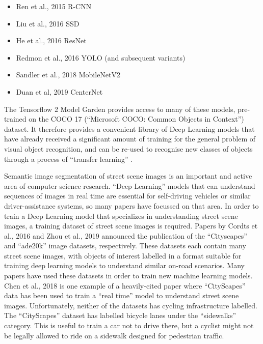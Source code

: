\documentclass[11pt,twoside]{report}
\begin{document}
\begin{itemize}
\item{Ren et al., 2015 \cite{REN2016} R-CNN}
\item{Liu et al., 2016 \cite{ssd} SSD}
\item{He et al., 2016 \cite{He_2016_CVPR} ResNet}
\item{Redmon et al., 2016 \cite{YOLOv1} YOLO (and subsequent variants)}
\item{Sandler et al., 2018 \cite{MobileNetV2} MobileNetV2}
\item{Duan et al, 2019 \cite{centernet} CenterNet}
\end{itemize}

The Tensorflow 2 Model Garden \cite{zoo} provides access to many of these models, pre-trained on the COCO 17 (``Microsoft COCO: Common Objects in Context'') dataset.  It therefore provides a convenient library of Deep Learning models that have already received a significant amount of training for the general problem of visual object recognition, and can be re-used to recognise new classes of objects through a process of ``transfer learning'' \cite{coco} \cite{transferlearning}.

Semantic image segmentation of street scene images is an important and active area of computer science research.  ``Deep Learning'' models that can understand sequences of images in real time are essential for self-driving vehicles or similar driver-assistance systems, so many papers have focussed on that area.  In order to train a Deep Learning model that specializes in understanding street scene images, a training dataset of street scene images is required.  Papers by Cordts et al., 2016 \cite{Cordts_2016_CVPR} and Zhou et al., 2019 \cite{ade20k} announced the publication of the ``Cityscapes'' and ``ade20k'' image datasets, respectively.  These datasets each contain many street scene images, with objects of interest labelled in a format suitable for training deep learning models to understand similar on-road scenarios.  Many papers have used these datasets in order to train new machine learning models.  Chen et al., 2018 \cite{DEEPLAB} is one example of a heavily-cited paper where ``CityScapes'' data has been used to train a ``real time'' model to understand street scene images.  Unfortunately, neither of the datasets has cycling infrastructure labelled.  The ``CityScapes'' dataset has labelled bicycle lanes under the ``sidewalks'' category.  This is useful to train a car not to drive there, but a cyclist might not be legally allowed to ride on a sidewalk designed for pedestrian traffic.  
\end{document}
